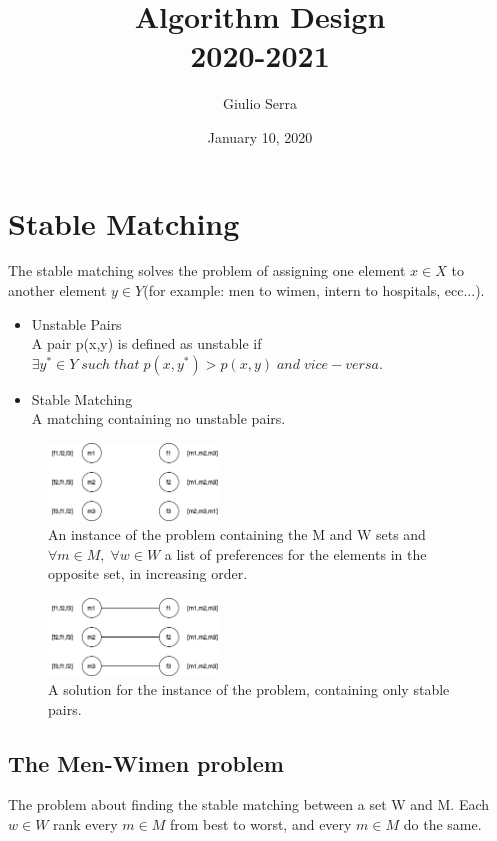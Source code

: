 \documentclass[11pt]{article}
\title{%
  Algorithm Design \\
  \large 2020-2021}
\author{Giulio Serra}
\date{January 10, 2020}
\begin{document}

\section{Stable Matching}
The stable matching solves the problem of assigning one element $x \in X$ to another element $y \in Y$(for example: men to wimen, intern to hospitals, ecc...).

\begin{itemize}
\item Unstable Pairs\\
A pair p(x,y) is defined as unstable if $\exists y^{*} \in Y \; such \;that \;p(x,y^{*}) > p(x,y) \; and \; vice-versa. $ 

\item Stable Matching\\
A matching containing no unstable pairs.
\end{itemize}


\begin{figure}[h]
		\centering
		\includegraphics[width=0.4\textwidth ]{GS}
		\caption{An instance of the problem containing the M and W sets and $\forall m \in M, \; \forall w \in W$ a list of preferences for the elements in the opposite set, in increasing order.}
\end{figure}

\begin{figure}[h]
		\centering
		\includegraphics[width=0.4\textwidth ]{GS-Solved}
		\caption{A solution for the instance of the problem, containing only stable pairs.}
\end{figure}


\subsection{The Men-Wimen problem}
The problem about finding the stable matching between a set W and M. Each $w \in W$ rank every $m \in M$ from best to worst, and every $m \in M$ do the same.
\end{document}
